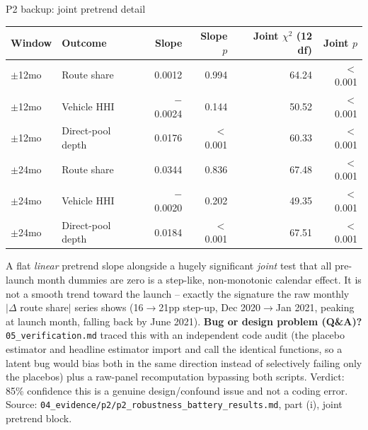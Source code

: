 \documentclass[aspectratio=169]{beamer}
\begin{document}
\begin{frame}{P2 backup: joint pretrend detail}
  \footnotesize
  \begin{center}
  \begin{tabular}{@{}l l r r r r@{}}
    \toprule
    Window & Outcome & Slope & Slope $p$ & Joint $\chi^2$ (12 df) & Joint $p$ \\
    \midrule
    $\pm$12mo & Route share & 0.0012 & 0.994 & 64.24 & $<$0.001 \\
    $\pm$12mo & Vehicle HHI & $-$0.0024 & 0.144 & 50.52 & $<$0.001 \\
    $\pm$12mo & Direct-pool depth & 0.0176 & $<$0.001 & 60.33 & $<$0.001 \\
    $\pm$24mo & Route share & 0.0344 & 0.836 & 67.48 & $<$0.001 \\
    $\pm$24mo & Vehicle HHI & $-$0.0020 & 0.202 & 49.35 & $<$0.001 \\
    $\pm$24mo & Direct-pool depth & 0.0184 & $<$0.001 & 67.51 & $<$0.001 \\
    \bottomrule
  \end{tabular}
  \end{center}
  \vspace{0.6em}
  A flat \emph{linear} pretrend slope alongside a hugely significant \emph{joint} test that all pre-launch month dummies are zero is a step-like, non-monotonic calendar effect. It is not a smooth trend toward the launch -- exactly the signature the raw monthly $|\Delta$ route share$|$ series shows (16$\to$21pp step-up, Dec 2020$\to$Jan 2021, peaking at launch month, falling back by June 2021).
  \vspace{0.4em}
  \textbf{Bug or design problem (Q\&A)?} \texttt{05\_verification.md} traced this with an independent code audit (the placebo estimator and headline estimator import and call the identical functions, so a latent bug would bias both in the same direction instead of selectively failing only the placebos) plus a raw-panel recomputation bypassing both scripts. Verdict: 85\% confidence this is a genuine design/confound issue and not a coding error.
  {\scriptsize Source: \texttt{04\_evidence/p2/p2\_robustness\_battery\_results.md}, part (i), joint pretrend block.}
\end{frame}
\end{document}
